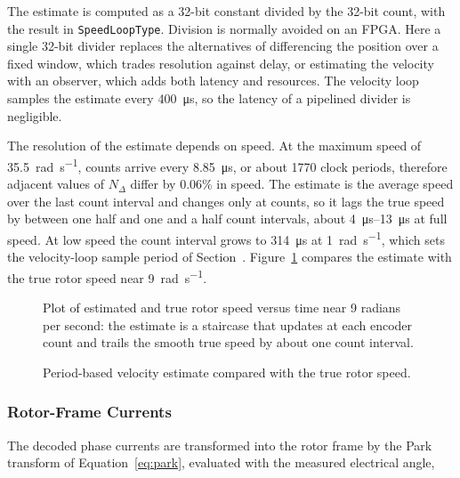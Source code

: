 The estimate is computed as a 32-bit constant divided by the 32-bit count, with the result in \texttt{SpeedLoopType}. Division is normally avoided on an FPGA. Here a single 32-bit divider replaces the alternatives of differencing the position over a fixed window, which trades resolution against delay, or estimating the velocity with an observer, which adds both latency and resources. The velocity loop samples the estimate every \SI{400}{\micro\second}, so the latency of a pipelined divider is negligible.

The resolution of the estimate depends on speed. At the maximum speed of \SI{35.5}{\radian\per\second}, counts arrive every \SI{8.85}{\micro\second}, or about 1770 clock periods, therefore adjacent values of $N_\Delta$ differ by 0.06\% in speed. The estimate is the average speed over the last count interval and changes only at counts, so it lags the true speed by between one half and one and a half count intervals, about \SIrange{4}{13}{\micro\second} at full speed. At low speed the count interval grows to \SI{314}{\micro\second} at \SI{1}{\radian\per\second}, which sets the velocity-loop sample period of Section~. Figure~\ref{fig:velocity_estimate_zoom} compares the estimate with the true rotor speed near \SI{9}{\radian\per\second}.


\begin{figure}[htbp]
	\centering
		{Plot of estimated and true rotor speed versus time near 9 radians per second: the estimate is a staircase that updates at each encoder count and trails the smooth true speed by about one count interval.}
	\caption[Period-based velocity estimate]{Period-based velocity estimate compared with the true rotor speed.}
	\label{fig:velocity_estimate_zoom}
\end{figure}

\subsubsection{Rotor-Frame Currents}

The decoded phase currents are transformed into the rotor frame by the Park
transform of Equation~\eqref{eq:park}, evaluated with the measured electrical
angle,

